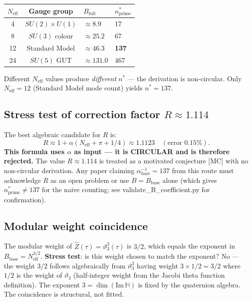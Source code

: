 \documentclass[12pt,a4paper]{article}
\theoremstyle{definition}
\theoremstyle{remark}
\begin{document}
\begin{center}
\begin{tabular}{ccll}
\toprule
$N_{\mathrm{eff}}$ & Gauge group & $B_{\mathrm{full}}$ & $n^*_{\mathrm{prime}}$ \\
\midrule
4  & $SU(2)\times U(1)$ & $\approx 8.9$   & 17 \\
8  & $SU(3)$ colour     & $\approx 25.2$  & 67 \\
12 & Standard Model     & $\approx 46.3$  & \textbf{137} \\
24 & $SU(5)$ GUT        & $\approx 131.0$ & 467 \\
\bottomrule
\end{tabular}
\end{center}

Different $N_{\mathrm{eff}}$ values produce \emph{different} $n^*$ — the derivation
is non-circular.  Only $N_{\mathrm{eff}} = 12$ (Standard Model mode count) yields
$n^* = 137$.

\subsection{Stress test of correction factor $R \approx 1.114$}

The best algebraic candidate for $R$ is:
\begin{equation}
  R \approx 1 + \alpha(N_{\mathrm{eff}} + \pi + 1/4) \approx 1.1123
  \quad (\text{error } 0.15\%).
  \label{eq:ar:R_candidate}
\end{equation}
\textbf{This formula uses $\alpha$ as input — it is CIRCULAR and is therefore
rejected.}  The value $R \approx 1.114$ is treated as a motivated conjecture [MC]
with no non-circular derivation.  Any paper claiming $\alpha^{-1}_{\mathrm{bare}} = 137$
from this route must acknowledge $R$ as an open problem or use
$B = B_{\mathrm{base}}$ alone (which gives $n^*_{\mathrm{prime}} \neq 137$ for the
naive counting; see validate\_B\_coefficient.py for confirmation).

\subsection{Modular weight coincidence}

The modular weight of $\hat{Z}(\tau) = \vartheta_3^3(\tau)$ is $3/2$, which
equals the exponent in $B_{\mathrm{base}} = N_{\mathrm{eff}}^{3/2}$.
\textbf{Stress test}: is this weight chosen to match the exponent?
No — the weight $3/2$ follows algebraically from $\vartheta_3^3$ having weight
$3 \times 1/2 = 3/2$ where $1/2$ is the weight of $\vartheta_3$ (half-integer
weight from the Jacobi theta function definition).  The exponent $3 = \dim(\mathrm{Im}\,\mathbb{H})$
is fixed by the quaternion algebra.  The coincidence is structural, not fitted.
\end{document}
